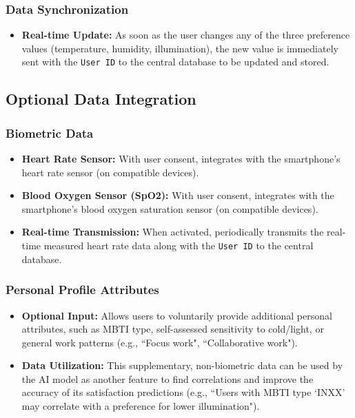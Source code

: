 \documentclass[conference]{IEEEtran}
\begin{document}
\subsubsection{Data Synchronization}
\begin{itemize}
    \item \textbf{Real-time Update:} As soon as the user changes any of the three preference values (temperature, humidity, illumination), the new value is immediately sent with the \texttt{User ID} to the central database to be updated and stored.
\end{itemize}

\subsection{Optional Data Integration}
\subsubsection{Biometric Data}
\begin{itemize}
    \item \textbf{Heart Rate Sensor:} With user consent, integrates with the smartphone's heart rate sensor (on compatible devices).
    \item \textbf{Blood Oxygen Sensor (SpO2):} With user consent, integrates with the smartphone's blood oxygen saturation sensor (on compatible devices).
    \item \textbf{Real-time Transmission:} When activated, periodically transmits the real-time measured heart rate data along with the \texttt{User ID} to the central database.
\end{itemize}
\subsubsection{Personal Profile Attributes}
\begin{itemize}
    \item \textbf{Optional Input:} Allows users to voluntarily provide additional personal attributes, such as MBTI type, self-assessed sensitivity to cold/light, or general work patterns (e.g., ``Focus work", ``Collaborative work").
    \item \textbf{Data Utilization:} This supplementary, non-biometric data can be used by the AI model as another feature to find correlations and improve the accuracy of its satisfaction predictions (e.g., ``Users with MBTI type `INXX' may correlate with a preference for lower illumination").
\end{itemize}
\end{document}
